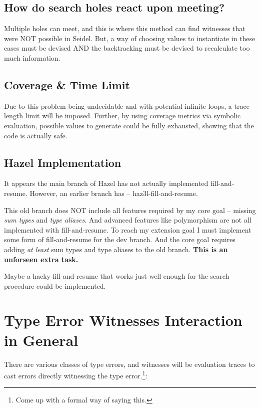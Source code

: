 \subsection{How do search holes react upon meeting?}
Multiple holes can meet, and this is where this method can find witnesses that were NOT possible in Seidel. But, a way of choosing values to instantiate in these cases must be devised AND the backtracking must be devised to recalculate too much information.

\subsection{Coverage \& Time Limit}
Due to this problem being undecidable and with potential infinite loops, a trace length limit will be imposed. Further, by using coverage metrics via symbolic evaluation, possible values to generate could be fully exhausted, showing that the code is actually safe.

\subsection{Hazel Implementation}
It appears the main branch of Hazel has not actually implemented fill-and-resume. However, an earlier branch has -- haz3l-fill-and-resume.\par 
This old branch does NOT include all features required by my core goal -- missing \textit{sum types} and \textit{type aliases}. And advanced features like polymorphism are not all implemented with fill-and-resume. To reach my extension goal I must implement some form of fill-and-resume for the dev branch. And the core goal requires adding \textit{at least} sum types and type aliases to the old branch. \textbf{This is an unforseen extra task.}\par 
Maybe a hacky fill-and-resume that works just well enough for the search procedure could be implemented.

\section{Type Error Witnesses Interaction in General}
There are various classes of type errors, and witnesses will be evaluation traces to cast errors directly witnessing the type error.\footnote{Come up with a formal way of saying this.}:

